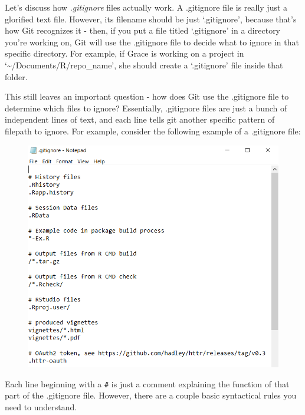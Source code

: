 \documentclass[]{book}
\begin{document}
Let's discuss how \emph{.gitignore} files actually work. A .gitignore
file is really just a glorified text file. However, its filename should
be just `.gitignore', because that's how Git recognizes it - then, if
you put a file titled `.gitignore' in a directory you're working on, Git
will use the .gitignore file to decide what to ignore in that specific
directory. For example, if Grace is working on a project in
`\textasciitilde{}/Documents/R/repo\_name', she should create a
`.gitignore' file inside that folder.

This still leaves an important question - how does Git use the
.gitignore file to determine which files to ignore? Essentially,
.gitignore files are just a bunch of independent lines of text, and each
line tells git another specific pattern of filepath to ignore. For
example, consider the following example of a .gitignore file:

\begin{figure}
\centering
\includegraphics{images/gitignore3.PNG}
\caption{}
\end{figure}

Each line beginning with a \texttt{\#} is just a comment explaining the
function of that part of the .gitignore file. However, there are a
couple basic syntactical rules you need to understand.
\end{document}
